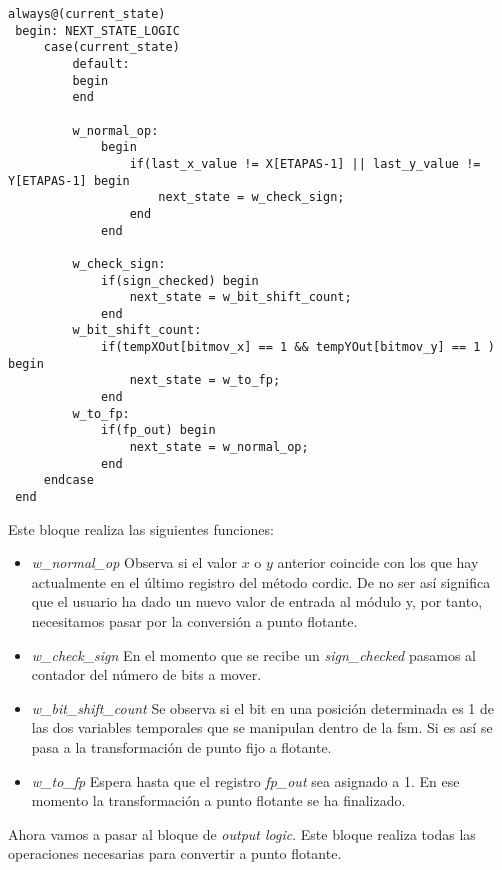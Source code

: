 \begin{lstlisting}[caption={Código de la \textit{next state logic} de la \gls{fsm}}]
always@(current_state)
 begin: NEXT_STATE_LOGIC
     case(current_state)
         default:
         begin
         end
         
         w_normal_op:
             begin
                 if(last_x_value != X[ETAPAS-1] || last_y_value != Y[ETAPAS-1] begin
                     next_state = w_check_sign;
                 end
             end

         w_check_sign:
             if(sign_checked) begin
                 next_state = w_bit_shift_count;
             end
         w_bit_shift_count:
             if(tempXOut[bitmov_x] == 1 && tempYOut[bitmov_y] == 1 ) begin
                 next_state = w_to_fp;
             end
         w_to_fp:
             if(fp_out) begin
                 next_state = w_normal_op;
             end
     endcase
 end
\end{lstlisting}

Este bloque realiza las siguientes funciones:

\begin{itemize}
	\item \textit{w\_normal\_op} Observa si el valor $x$ o $y$ anterior coincide con los que hay actualmente en el último registro del método \gls{cordic}. De no ser así significa que el usuario ha dado un nuevo valor de entrada al módulo y, por tanto, necesitamos pasar por la conversión a punto flotante.
	
	\item \textit{w\_check\_sign} En el momento que se recibe un \textit{sign\_checked} pasamos al contador del número de bits a mover.
	
	\item \textit{w\_bit\_shift\_count} Se observa si el bit en una posición determinada es 1 de las dos variables temporales que se manipulan dentro de la \gls{fsm}. Si es así se pasa a la transformación de punto fijo a flotante.
	
	\item \textit{w\_to\_fp} Espera hasta que el registro \textit{fp\_out} sea asignado a 1. En ese momento la transformación a punto flotante se ha finalizado.
\end{itemize} 

Ahora vamos a pasar al bloque de \textit{output logic}. Este bloque realiza todas las operaciones necesarias para convertir a punto flotante.

